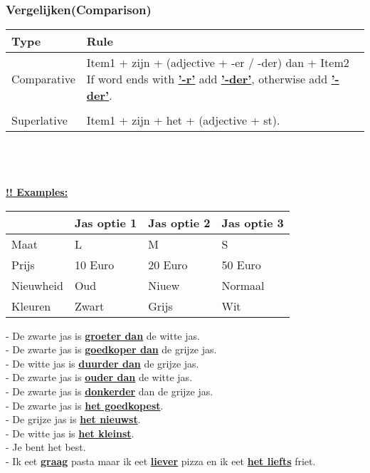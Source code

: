\documentclass[a4paper,14pt]{extarticle}
\newcommand{\attention}[1]{\underline{\textbf{!! #1}}}
\newcommand{\emp}[1]{\underline{\textbf{#1}}}
\begin{document}
\subsubsection{Vergelijken(Comparison)}
\begin{tabularx}{\textwidth}{p{} p{}}
 \hline
\textbf{Type} & \textbf{Rule} \\
 \hline
Comparative & Item1 + zijn + (adjective + -er / -der) dan + Item2 \newline If word ends with \emp{'-r'} add \emp{'-der'}, otherwise add \emp{'-der'}.\\\\
Superlative & Item1 + zijn + het + (adjective + st). \\
\end{tabularx} \\ \\ \\
\attention{Examples:} \\
\begin{center}
\begin{tabularx}{400pt}{p{75pt} p{100pt} p{100pt} p{100pt}}
\hline
& Jas optie 1 & Jas optie 2 & Jas optie 3\\
\hline
Maat & L & M & S \\
Prijs & 10 Euro & 20 Euro & 50 Euro \\
Nieuwheid & Oud & Niuew & Normaal \\
Kleuren & Zwart & Grijs & Wit \\
\end{tabularx} 
\end{center}
- De zwarte jas is \emp{groeter dan} de witte jas. \\
- De zwarte jas is \emp{goedkoper dan} de grijze jas. \\
- De witte jas is \emp{duurder dan} de grijze jas. \\
- De zwarte jas is \emp{ouder dan} de witte jas. \\
- De zwarte jas is \emp{donkerder} dan de grijze jas. \\
- De zwarte jas is \emp{het goedkopest}. \\
- De grijze jas is \emp{het nieuwst}. \\
- De witte jas is \emp{het kleinst}. \\
- Je bent het best. \\
- Ik eet \emp{graag} pasta maar ik eet \emp{liever} pizza en ik eet \emp{het liefts} friet. \\ \\
\end{document}
